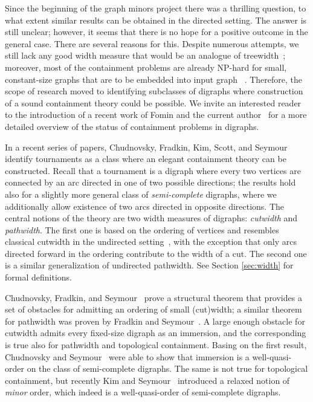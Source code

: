 \documentclass[a4paper,10pt]{article}
\begin{document}
Since the beginning of the graph minors project there was a thrilling question, to what extent similar results can be obtained in the directed setting. The answer is still unclear; however, it seems that there is no hope for a positive outcome in the general case. There are several reasons for this. Despite numerous attempts, we still lack any good width measure that would be an analogue of treewidth~\cite{ganian-i-kumple}; moreover, most of the containment problems are already NP-hard for small, constant-size graphs  that are to be embedded into input graph ~\cite{FortuneHW80}. Therefore, the scope of research moved to identifying subclasses of digraphs where construction of a sound containment theory could be possible. We invite an interested reader to the introduction of a recent work of Fomin and the current author~\cite{my} for a more detailed overview of the status of containment problems in digraphs.

\vskip 0.15cm

 In a recent series of papers, Chudnovsky, Fradkin, Kim, Scott, and Seymour~\cite{ChudnovskyFS2011,ChudnovskySS2011,ChudnovskyS11,fradkin-seymourEDP,fradkin-seymour,kim-seymour-minors} identify tournaments as a class where an elegant containment theory can be constructed. Recall that a tournament is a digraph where every two vertices are connected by an arc directed in one of two possible directions; the results hold also for a slightly more general class of {\em{semi-complete}} digraphs, where we additionally allow existence of two arcs directed in opposite directions. The central notions of the theory are two width measures of digraphs: {\em{cutwidth}} and {\em{pathwidth}}. The first one is based on the ordering of vertices and resembles classical cutwidth in the undirected setting~\cite{thilikos-i-kumple}, with the exception that only arcs directed forward in the ordering contribute to the width of a cut. The second one is a similar generalization of undirected pathwidth. See Section \ref{sec:width} for formal definitions.

Chudnovsky, Fradkin, and Seymour~\cite{ChudnovskyFS2011} prove a structural theorem that provides a set of obstacles for admitting an ordering of small (cut)width; a similar theorem for pathwidth was proven by Fradkin and Seymour~\cite{fradkin-seymour}. A large enough obstacle for cutwidth admits every fixed-size digraph as an immersion, and the corresponding is true also for pathwidth and topological containment. Basing on the first result, Chudnovsky and Seymour~\cite{ChudnovskyS11} were able to show that immersion is a well-quasi-order on the class of semi-complete digraphs. The same is not true for topological containment, but recently Kim and Seymour~\cite{kim-seymour-minors} introduced a relaxed notion of {\em{minor}} order, which indeed is a well-quasi-order of semi-complete digraphs.
\end{document}
